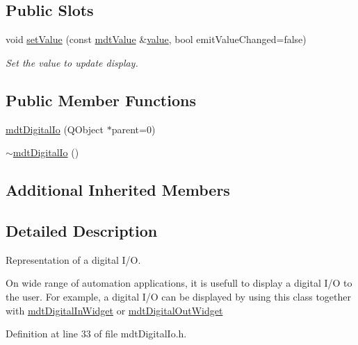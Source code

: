 \subsection*{Public Slots}
\begin{DoxyCompactItemize}
\item 
void \hyperlink{classmdt_digital_io_a5bb40caa30bd967fdacd16d9f6654fd3}{set\-Value} (const \hyperlink{classmdt_value}{mdt\-Value} \&\hyperlink{classmdt_abstract_io_a839b0d3a4a1d4616e5b20d744c5f75a1}{value}, bool emit\-Value\-Changed=false)
\begin{DoxyCompactList}\small\item\em Set the value to update display. \end{DoxyCompactList}\end{DoxyCompactItemize}
\subsection*{Public Member Functions}
\begin{DoxyCompactItemize}
\item 
\hyperlink{classmdt_digital_io_ab5cca7698845624d99f94052d87790bb}{mdt\-Digital\-Io} (Q\-Object $\ast$parent=0)
\item 
\hyperlink{classmdt_digital_io_a1397b14299334202786dbffee63bc208}{$\sim$mdt\-Digital\-Io} ()
\end{DoxyCompactItemize}
\subsection*{Additional Inherited Members}


\subsection{Detailed Description}
Representation of a digital I/\-O. 

On wide range of automation applications, it is usefull to display a digital I/\-O to the user. For example, a digital I/\-O can be displayed by using this class together with \hyperlink{classmdt_digital_in_widget}{mdt\-Digital\-In\-Widget} or \hyperlink{classmdt_digital_out_widget}{mdt\-Digital\-Out\-Widget} 

Definition at line 33 of file mdt\-Digital\-Io.\-h.



